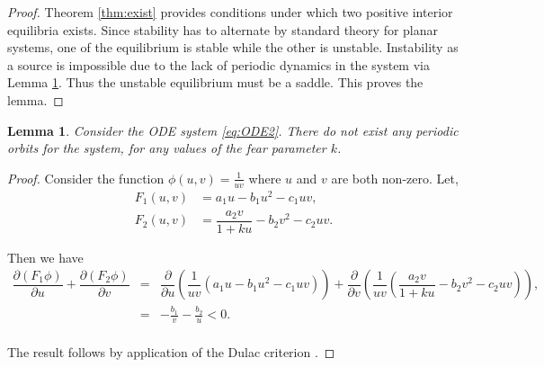 \documentclass[10pt]{amsart}
\newtheorem{lemma}[theorem]{Lemma}
\theoremstyle{definition}
\begin{document}
\begin{proof}
	Theorem \ref{thm:exist} provides conditions under which two positive interior equilibria exists. Since stability has to alternate by standard theory \cite{perko2013differential} for planar systems, one of the equilibrium is stable while the other is unstable. Instability as a source is impossible due to the lack of periodic dynamics in the system via Lemma \ref{lem:dc1}. Thus the unstable equilibrium must be a saddle. This proves the lemma.
\end{proof}

\begin{lemma}\label{lem:dc1}
	Consider the ODE system \eqref{eq:ODE2}. There do not exist any periodic orbits for the system, for any values of the fear parameter $k$.
\end{lemma}

\begin{proof}
	Consider the function $\phi(u,v) = \frac{1}{u v}$ where $u$ and $v$ are both non-zero. Let,
	\begin{equation*}\label{eq:F}
	\begin{split}
		F_1(u,v) &= a_1 u -b_1 u^2 -c_1 uv, \\
		F_2(u,v)&=  \dfrac{a_2 v}{1+ku}  -b_2 v^2 -c_2 uv.
	\end{split}
\end{equation*}
		
	 Then we have
	\begin{eqnarray}
	\dfrac{\partial (F_1 \phi)}{\partial u} + \dfrac{\partial (F_2 \phi)}{\partial v}  
	&=& \dfrac{\partial}{\partial u} \left( \dfrac{1}{u v} (a_1 u -b_1 u^2 -c_1 uv)  \right) + \dfrac{\partial}{\partial v} \left( \dfrac{1}{u v} \left(\dfrac{a_2 v}{1+ku}  -b_2 v^2 -c_2 uv\right)  \right),  \nonumber \\
	&=& - \frac{b_{1}}{v} - \frac{b_{2}}{u} < 0.\nonumber \\
	\end{eqnarray}
	
	The result follows by application of the Dulac criterion \cite{perko2013differential}.
\end{proof}
\end{document}
